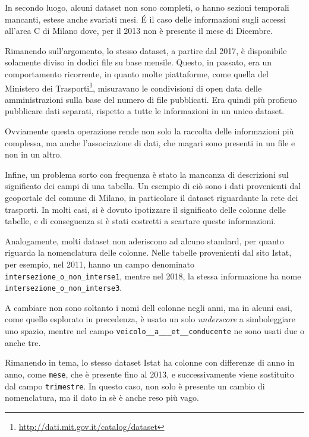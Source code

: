 \documentclass[a4paper,12pt]{report}
\newcommand{\columnstyle}[1]{\texttt{#1}}
\newcommand{\quotestyle}[1]{\textit{#1}}
\newcommand{\skipline}{\vspace{0.2in}}
\begin{document}
\skipline
In secondo luogo, alcuni dataset non sono completi, o hanno sezioni temporali mancanti,
estese anche svariati mesi. 
\'E il caso delle informazioni sugli accessi all'area C di Milano dove, 
per il 2013 non è presente il mese di Dicembre.

Rimanendo sull'argomento, lo stesso dataset, a partire dal 2017, è disponibile 
solamente diviso in dodici file su base mensile.
Questo, in passato, era un comportamento ricorrente, in 
quanto molte piattaforme, come quella del Ministero dei 
Trasporti\footnote{\url{http://dati.mit.gov.it/catalog/dataset}}, 
misuravano le condivisioni di open data delle amministrazioni 
sulla base del numero di file pubblicati. 
Era quindi più proficuo pubblicare dati separati, rispetto a tutte le informazioni in 
un unico dataset. 

Ovviamente questa operazione rende non solo la raccolta delle informazioni più complessa, 
ma anche l'associazione di dati, che magari sono presenti in un file e non in un altro.

\skipline
Infine, un problema sorto con frequenza è stato la mancanza di descrizioni sul 
significato dei campi di una tabella. 
Un esempio di ciò sono i dati provenienti dal geoportale del comune di Milano, 
in particolare il dataset riguardante la rete dei trasporti.
In molti casi, si è dovuto ipotizzare il significato delle colonne delle tabelle, 
e di conseguenza si è stati costretti a scartare queste informazioni. 

Analogamente, molti dataset non aderiscono ad 
alcuno standard, per quanto riguarda la nomenclatura delle colonne.
Nelle tabelle provenienti dal sito Istat, per esempio, nel 2011, hanno un campo denominato 
\columnstyle{intersezione\_o\_non\_interse1}, mentre nel 2018, la stessa informazione ha 
nome \columnstyle{intersezione\_o\_non\_interse3}. 

A cambiare non sono soltanto i nomi dell colonne negli anni, ma in alcuni casi, 
come quello esplorato in precedenza, è usato un solo \quotestyle{underscore} a 
simboleggiare uno spazio, mentre nel campo \columnstyle{veicolo\_\_a\_\_\_et\_\_conducente} 
ne sono usati due o anche tre.

Rimanendo in tema, lo stesso dataset Istat ha colonne con differenze di anno in anno, 
come \columnstyle{mese}, che è presente fino al 2013, e successivamente viene 
sostituito dal campo \columnstyle{trimestre}. 
In questo caso, non solo è presente un cambio di nomenclatura, ma il dato in sè è 
anche reso più vago.
\end{document}
